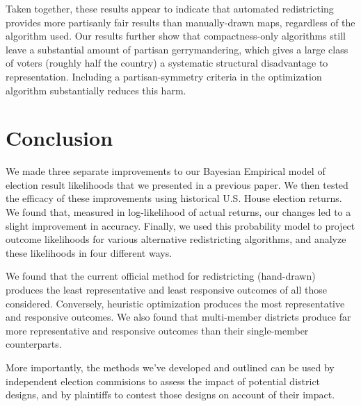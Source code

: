 \documentclass[preprint,12pt]{article}
\begin{document}
Taken together, these results appear to indicate that automated redistricting provides more partisanly fair results than manually-drawn maps, regardless of the algorithm used.  Our results further show that compactness-only algorithms still leave a substantial amount of partisan gerrymandering, which gives a large class of voters (roughly half the country) a systematic structural disadvantage to representation.  Including a partisan-symmetry criteria in the optimization algorithm substantially reduces this harm.

\section{Conclusion}

We made three separate improvements to our Bayesian Empirical model of election result likelihoods that we presented in a previous paper.  We then tested the efficacy of these improvements using historical U.S. House election returns.  We found that, measured in log-likelihood of actual returns, our changes led to a slight improvement in accuracy.  Finally, we used this probability model to project outcome likelihoods for various alternative redistricting algorithms, and analyze these likelihoods in four different ways.

We found that the current official method for redistricting (hand-drawn) produces the least representative and least responsive outcomes of all those considered.  Conversely, heuristic optimization produces the most representative and responsive outcomes.  We also found that multi-member districts produce far more representative and responsive outcomes than their single-member counterparts.

More importantly, the methods we've developed and outlined can be used by independent election commisions to assess the impact of potential district designs, and by plaintiffs to contest those designs on account of their impact.



\clearpage
\end{document}
